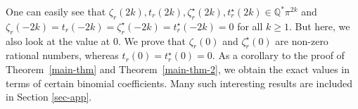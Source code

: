 \documentclass[12pt]{amsart}
\newcommand{\Q}{{\mathbb Q}}
\newtheorem{cor}{Corollary}
\newcommand{\thmref}[1]{Theorem~\ref{#1}}
\newcommand{\lemref}[1]{Lemma~\ref{#1}}
\begin{document}


One can easily see that  $\zeta_r(2k),t_r(2k),\zeta_r^{\star}(2k),t_r^{\star}(2k) \in \Q^* \pi^{2k}$ and $\zeta_r(-2k)=t_r(-2k)=\zeta_r^{\star}(-2k)=t_r^{\star}(-2k)=0$ for all $k\geq 1$. But here, we also look at the value at $0$.  We prove that $\zeta_r(0)$ and $\zeta^{\star}_r(0)$ are non-zero rational numbers, whereas $t_r(0)=t^{\star}_r(0)=0$.
As a corollary to the proof of \thmref{main-thm} and \thmref{main-thm-2}, we obtain the exact values in terms of certain binomial coefficients. Many such interesting results are included in Section \ref{sec-app}.
\end{document}
